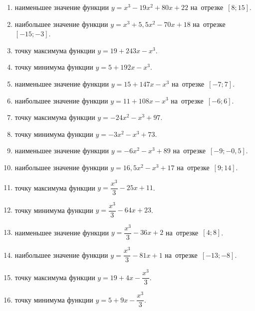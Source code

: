 \documentclass[a4paper,10pt]{article}
\begin{document}
\begin{enumerate}
\item {} наименьшее значение функции $y=x^3 -19x^2+80x+22$ на~отрезке~$\left[8;15\right]$.

\item {} наибольшее значение функции $y=x^3 +5,5x^2-70x+18$ на~отрезке~$\left[-15;-3\right]$.

\item {} точку максимума функции $y=19+243x-x^3$.

\item {} точку минимума функции $y=5+192x-x^3$.

\item {} наименьшее значение функции $y=15+147x-x^3$ на~отрезке~$\left[-7;7\right]$.

\item {} наибольшее значение функции $y=11+108x-x^3$ на~отрезке~$\left[-6;6\right]$.

\item {} точку максимума функции $y=-24x^2-x^3+97$.

\item {} точку минимума функции $y=-3x^2-x^3+73$.

\item {} наименьшее значение функции $y=-6x^2-x^3+89$ на~отрезке~$\left[-9;-0,5\right]$.

\item {} наибольшее значение функции $y=16,5x^2-x^3+17$ на~отрезке~$\left[9;14\right]$.

\item {} точку максимума функции $y=\dfrac{x^3}{3} -25x+11$.

\item {} точку минимума функции $y=\dfrac{x^3}{3} -64x+23$.

\item {} наименьшее значение функции $y=\dfrac{x^3}{3} -36x+2$ на~отрезке~$\left[4;8\right]$.

\item {} наибольшее значение функции $y=\dfrac{x^3}{3} -81x+1$ на~отрезке~$\left[-13;-8\right]$.

\item {} точку максимума функции $y=19 +4x-\dfrac{x^3}{3}$.

\item {} точку минимума функции $y=5 +9x-\dfrac{x^3}{3}$.


\end{enumerate}
\end{document}
